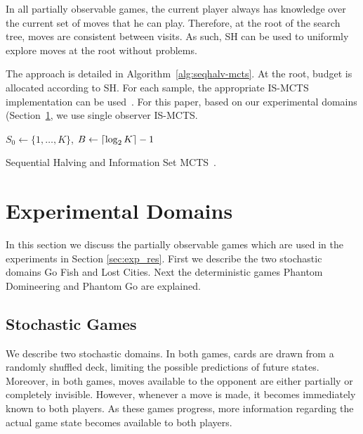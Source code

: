 \documentclass[a4paper]{llncs}
\DeclarePairedDelimiter{\ceil}{\lceil}{\rceil}
\DeclarePairedDelimiter{\floor}{\lfloor}{\rfloor}
\begin{document}
In all partially observable games, the current player always has knowledge over the current set of moves that he can play. Therefore, at the root of the search tree, moves are consistent between visits. As such, SH can be used to uniformly explore moves at the root without problems. 

The approach is detailed in Algorithm~\ref{alg:seqhalv-mcts}. At the root, budget is allocated according to SH. For each sample, the appropriate IS-MCTS implementation can be used~\cite{cowling2012}. For this paper, based on our experimental domains (Section~\ref{sec:exp_dom}, we use single observer IS-MCTS.

\IncMargin{1em}
\begin{algorithm2e}[ht]
	\vspace{0.05cm}
	$S_0 \gets \{1,\dots,K\}$,
	$B \gets \ceil{\log_2{K}} - 1$														\;
	\BlankLine
  \caption[Sequential Halving]{Sequential Halving and Information Set MCTS~\protect. \label{alg:seqhalv-mcts}}
\end{algorithm2e}
\DecMargin{1em}

\section{Experimental Domains}
\label{sec:exp_dom}

In this section we discuss the partially observable games which are used in the experiments in Section \ref{sec:exp_res}. First we describe the two stochastic domains Go Fish and Lost Cities. Next the deterministic games Phantom Domineering and Phantom Go are explained.

\subsection{Stochastic Games}

We describe two stochastic domains. In both games, cards are drawn from a randomly shuffled deck, limiting the possible predictions of future states. Moreover, in both games, moves available to the opponent are either partially or completely invisible. However, whenever a move is made, it becomes immediately known to both players. As these games progress, more information regarding the actual game state becomes available to both players.
\end{document}
